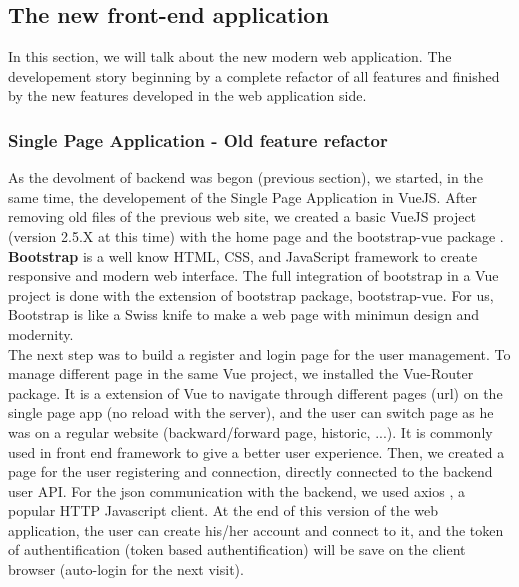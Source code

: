 \documentclass{eplmastersthesis}
\begin{document}
      \subsection{The new front-end application} %

        In this section, we will talk about the new modern web application.
        The developement story beginning by a complete refactor of all features
        and finished by the new features developed in the web application side.

        \subsubsection{Single Page Application - Old feature refactor}
        As the devolment of backend was begon (previous section), we started, in the same time, the
        developement of the Single Page Application in VueJS. After removing
        old files of the previous web site, we created a basic VueJS project
        (version 2.5.X at this time) with the home page and the bootstrap-vue
        package \cite{BootstrapVue}. \textbf{Bootstrap} \cite{Bootstrap} is a
        well know HTML, CSS, and JavaScript framework to create responsive and
        modern web interface. The full integration of bootstrap in a Vue
        project is done with the extension of bootstrap package, bootstrap-vue.
        For us, Bootstrap is like a Swiss knife to make a web page with minimun
        design and modernity. \\

        The next step was to build a register and login page for the user
        management. To manage different page in the same Vue project, we
        installed the Vue-Router package. It is a extension of Vue to navigate
        through different pages (url) on the single page app (no reload with
        the server), and the user can switch page as he was on a regular
        website (backward/forward page, historic, ...). It is commonly used in
        front end framework to give a better user experience. Then, we created
        a page for the user registering and connection, directly connected to
        the backend user API. For the json communication with the backend, we
        used axios \cite{axios}, a popular HTTP Javascript client. At the end
        of this version of the web application, the user can create his/her
        account and connect to it, and the token of authentification (token
        based authentification) will be save on the client browser (auto-login
        for the next visit). \\
\end{document}
